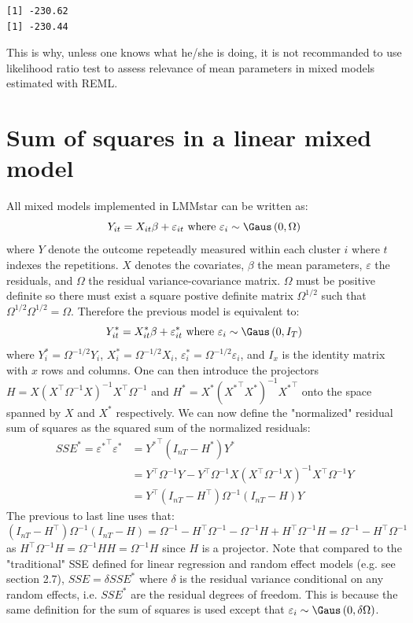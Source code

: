 \documentclass[12pt]{article}
\newcommand\trans[1]{{#1}^\intercal}%
\begin{document}
\begin{verbatim}
[1] -230.62
[1] -230.44
\end{verbatim}


This is why, unless one knows what he/she is doing, it is not
recommanded to use likelihood ratio test to assess relevance of mean
parameters in mixed models estimated with REML.

\clearpage

\section{Sum of squares in a linear mixed model}
\label{SM:sumSquares}
All mixed models implemented in LMMstar can be written as:
\[ Y_{it} = X_{it}\beta + \varepsilon_{it} \text{ where } \varepsilon_{i} \sim \Gaus\left(0,\Omega\right)\]
where \(Y\) denote the outcome repeteadly measured within each cluster
\(i\) where \(t\) indexes the repetitions. \(X\) denotes the
covariates, \(\beta\) the mean parameters, \(\varepsilon\) the
residuals, and \(\Omega\) the residual variance-covariance matrix.
\(\Omega\) must be positive definite so there must exist a square
postive definite matrix \(\Omega^{1/2}\) such that
\(\Omega^{1/2}\Omega^{1/2} = \Omega\). Therefore the previous model is
equivalent to:
\[ Y^*_{it} = X^*_{it}\beta + \varepsilon^*_{it} \text{ where } \varepsilon_{i} \sim \Gaus\left(0,I_T\right)\]
where \(Y^*_{i} = \Omega^{-1/2} Y_{i}\), \(X^*_{i} = \Omega^{-1/2}
X_{i}\), \(\varepsilon^*_{i} = \Omega^{-1/2} \varepsilon_{i}\), and
\(I_x\) is the identity matrix with \(x\) rows and columns. One can
then introduce the projectors \(H= X \left(\trans{X}\Omega^{-1}
X\right)^{-1}\trans{X} \Omega^{-1}\) and \(H^*= X^*
\left(\trans{X^*}X^*\right)^{-1}\trans{X^*}\) onto the space spanned
by \(X\) and \(X^*\) respectively. We can now define the "normalized"
residual sum of squares as the squared sum of the normalized
residuals:
\begin{align*}
SSE^* = \trans{\varepsilon^*} \varepsilon^* &= \trans{Y^*} (I_{nT}-H^*) Y^* \\
&= \trans{Y} \Omega^{-1} Y - \trans{Y} \Omega^{-1} X \left(\trans{X}\Omega^{-1} X\right)^{-1} \trans{X} \Omega^{-1} Y \\
&= \trans{Y} (I_{nT}-\trans{H}) \Omega^{-1} (I_{nT}-H) Y 
\end{align*}
The previous to last line uses that: \((I_{nT}-\trans{H}) \Omega^{-1}
(I_{nT}-H)= \Omega^{-1} - \trans{H} \Omega^{-1} - \Omega^{-1}H +
\trans{H} \Omega^{-1} H = \Omega^{-1} - \trans{H}\Omega^{-1}\) as
\(\trans{H} \Omega^{-1} H = \Omega^{-1}HH=\Omega^{-1}H\) since \(H\)
is a projector. Note that compared to the "traditional" SSE defined
for linear regression and random effect models (e.g. see
\cite{christensen2002plane} section 2.7), \(SSE=\delta SSE^{*}\) where
\(\delta\) is the residual variance conditional on any random effects,
i.e. \(SSE^{*}\) are the residual degrees of freedom. This is because
the same definition for the sum of squares is used except that
\(\varepsilon_{i} \sim \Gaus\left(0,\delta\Omega\right)\).
\end{document}
